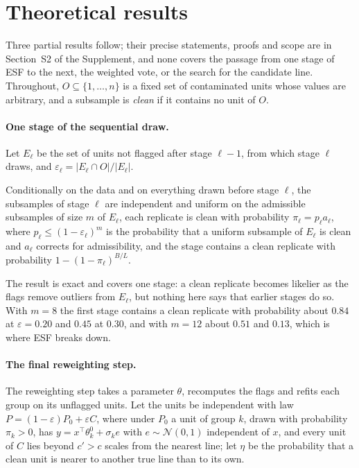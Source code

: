 \section{Theoretical results}
\label{sec:theory}

Three partial results follow; their precise statements, proofs and scope are in Section~S2 of
the Supplement, and none covers the passage from one stage of ESF to the next, the weighted
vote, or the search for the candidate line. Throughout, $O\subseteq\{1,\dots,n\}$ is a fixed set of
contaminated units whose values are arbitrary, and a subsample is \emph{clean} if it contains
no unit of $O$.

\paragraph{One stage of the sequential draw.}
\label{sec:stage}
Let $E_\ell$ be the set of units not flagged after stage $\ell-1$, from which stage $\ell$
draws, and $\varepsilon_\ell=|E_\ell\cap O|/|E_\ell|$.

\begin{proposition}
\label{prop:clean}
Conditionally on the data and on everything drawn before stage $\ell$, the subsamples of stage
$\ell$ are independent and uniform on the admissible subsamples of size $m$ of $E_\ell$, each
replicate is clean with probability $\pi_\ell=p_\ell a_\ell$, where
$p_\ell\le(1-\varepsilon_\ell)^{m}$ is the probability that a uniform subsample of $E_\ell$ is
clean and $a_\ell$ corrects for admissibility, and the stage contains a clean replicate
with probability $1-(1-\pi_\ell)^{B/L}$.
\end{proposition}

The result is exact and covers one stage: a clean replicate becomes likelier as the flags
remove outliers from $E_\ell$, but nothing here says that earlier stages do so. With $m=8$ the
first stage contains a clean replicate with probability about $0.84$ at $\varepsilon=0.20$ and
$0.45$ at $0.30$, and with $m=12$ about $0.51$ and $0.13$, which is where ESF breaks down.

\paragraph{The final reweighting step.}
\label{sec:reweight}
The reweighting step takes a parameter $\theta$, recomputes the flags and refits each group on
its unflagged units. Let the units be independent with law $P=(1-\varepsilon)P_0+\varepsilon C$,
where under $P_0$ a unit of group $k$, drawn with probability $\pi_k>0$, has
$y=x^{\top}\theta^{0}_k+\sigma_ke$ with $e\sim\mathcal N(0,1)$ independent of $x$, and every
unit of $C$ lies beyond $c'>c$ scales from the nearest line; let $\eta$ be the probability that
a clean unit is nearer to another true line than to its own.

